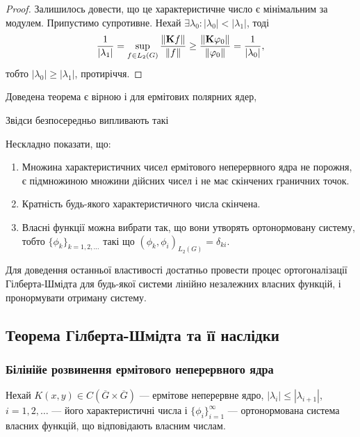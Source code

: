 \begin{proof}
    Залишилось довести, що це характеристичне число є мінімальним за модулем. Припустимо супротивне. Нехай $\exists \lambda_0: |\lambda_0| < |\lambda_1|$, тоді
    \begin{equation}
        \frac{1}{|\lambda_1|} = \sup_{f \in L_2(G)} \frac{\|\bf{K}f\|}{\|f\|} \ge \frac{\|\bf{K}\phi_0\|}{\|\phi_0\|} = \frac{1}{|\lambda_0|},
    \end{equation}
    тобто $|\lambda_0| \ge |\lambda_1|$, протиріччя.
\end{proof}

\begin{remark}
    Доведена теорема є вірною і для ермітових полярних ядер,
\end{remark}

Звідси безпосередньо випливають такі 
\begin{properties}
    Нескладно показати, що:
    \begin{enumerate}
        \item Множина характеристичних чисел ермітового неперервного \allowbreak ядра не порожня, є підмножиною множини дійсних чисел і не має скінчених граничних точок.
        \item Кратність будь-якого характеристичного числа скінчена.
        \item Власні функції можна вибрати так, що вони утворять ортонормовану систему, тобто $\{ \phi_k\}_{k = 1, 2, \ldots}$ такі що $(\phi_k, \phi_i)_{L_2(G)} = \delta_{ki}$.
    \end{enumerate}
\end{properties}

\begin{remark}
    Для доведення останньої властивості достатньо провести процес ортогоналізації Гілберта-Шмідта для будь-якої системи лінійно незалежних власних функцій, і пронормувати отриману систему.
\end{remark}

\subsection{Теорема Гілберта-Шмідта та її наслідки}

\subsubsection{Білінійе розвинення ермітового неперервного ядра}

Нехай $K(x, y) \in C\left(\overline G \times \overline G\right)$ --- ермітове неперервне ядро, $|\lambda_i| \le |\lambda_{i + 1}|$, $i = 1, 2, \ldots$ --- його характеристичні числа і $\{\phi_i\}_{i = 1}^\infty$ --- ортонормована система власних функцій, що відповідають власним числам. \medskip

